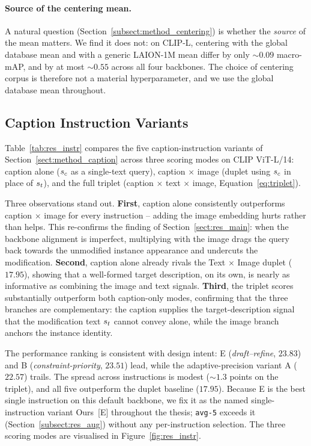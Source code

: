 \paragraph{Source of the centering mean.} A natural question
(Section~\ref{subsect:method_centering}) is whether the \emph{source} of the mean
matters. We find it does not: on CLIP-L, centering with the global database mean
and with a generic LAION-1M mean differ by only $\sim\!0.09$ macro-mAP, and by at
most $\sim\!0.55$ across all four backbones. The choice of centering corpus is
therefore not a material hyperparameter, and we use the global database mean
throughout.

\subsection{Caption Instruction Variants}\label{subsect:res_ablation_instr}

Table~\ref{tab:res_instr} compares the five caption-instruction variants of
Section~\ref{sect:method_caption} across three scoring modes on CLIP ViT-L/14:
caption alone ($\sc$ as a single-text query), caption $\times$ image (duplet
using $\sc$ in place of $\st$), and the full triplet (caption $\times$ text
$\times$ image, Equation~\eqref{eq:triplet}).

Three observations stand out.
\textbf{First}, caption alone consistently outperforms caption $\times$ image
for every instruction -- adding the image embedding hurts rather than helps.
This re-confirms the finding of Section~\ref{sect:res_main}: when the backbone
alignment is imperfect, multiplying with the image drags the query back towards
the unmodified instance appearance and undercuts the modification.
\textbf{Second}, caption alone already rivals the Text $\times$ Image duplet
($17.95$), showing that a well-formed target description, on its own, is nearly
as informative as combining the image and text signals.
\textbf{Third}, the triplet scores substantially outperform both caption-only
modes, confirming that the three branches are complementary: the caption supplies
the target-description signal that the modification text $\st$ cannot convey
alone, while the image branch anchors the instance identity.

The performance ranking is consistent with design intent: \textsc{E}
(\emph{draft--refine}, $23.83$) and \textsc{B} (\emph{constraint-priority},
$23.51$) lead, while the adaptive-precision variant \textsc{A} ($22.57$) trails. The spread
across instructions is modest ($\sim\!1.3$ points on the triplet), and all five
outperform the duplet baseline ($17.95$). Because \textsc{E} is the best single
instruction on this default backbone, we fix it as the named single-instruction
variant Ours~[\textsc{E}] throughout the thesis; \texttt{avg-5} exceeds it
(Section~\ref{subsect:res_aug}) without any per-instruction selection. The three
scoring modes are visualised in Figure~\ref{fig:res_instr}.

